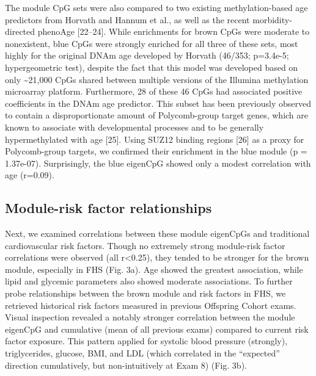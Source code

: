 \documentclass[]{article}
\theoremstyle{definition}
\theoremstyle{definition}
\theoremstyle{definition}
\theoremstyle{remark}
\begin{document}
The module CpG sets were also compared to two existing methylation-based
age predictors from Horvath and Hannum et al., as well as the recent
morbidity-directed phenoAge {[}22--24{]}. While enrichments for brown
CpGs were moderate to nonexistent, blue CpGs were strongly enriched for
all three of these sets, most highly for the original DNAm age developed
by Horvath (46/353; p=3.4e-5; hypergeometric test), despite the fact
that this model was developed based on only \textasciitilde{}21,000 CpGs
shared between multiple versions of the Illumina methylation microarray
platform. Furthermore, 28 of these 46 CpGs had associated positive
coefficients in the DNAm age predictor. This subset has been previously
observed to contain a disproportionate amount of Polycomb-group target
genes, which are known to associate with developmental processes and to
be generally hypermethylated with age {[}25{]}. Using SUZ12 binding
regions {[}26{]} as a proxy for Polycomb-group targets, we confirmed
their enrichment in the blue module (p = 1.37e-07). Surprisingly, the
blue eigenCpG showed only a modest correlation with age (r=0.09).

\subsection{Module-risk factor
relationships}\label{module-risk-factor-relationships}

Next, we examined correlations between these module eigenCpGs and
traditional cardiovascular risk factors. Though no extremely strong
module-risk factor correlations were observed (all
\textbar{}r\textbar{}\textless{}0.25), they tended to be stronger for
the brown module, especially in FHS (Fig. 3a). Age showed the greatest
association, while lipid and glycemic parameters also showed moderate
associations. To further probe relationships between the brown module
and risk factors in FHS, we retrieved historical risk factors measured
in previous Offspring Cohort exams. Visual inspection revealed a notably
stronger correlation between the module eigenCpG and cumulative (mean of
all previous exams) compared to current risk factor exposure. This
pattern applied for systolic blood pressure (strongly), triglycerides,
glucose, BMI, and LDL (which correlated in the ``expected'' direction
cumulatively, but non-intuitively at Exam 8) (Fig. 3b).
\end{document}
